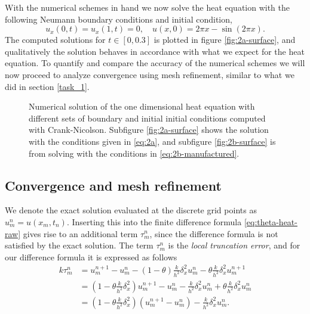 With the numerical schemes in hand we now solve the heat equation with the following Neumann boundary conditions and initial condition, 
\begin{equation}
    u_x(0,t) = u_x(1,t) = 0, \quad u(x,0) = 2\pi x - \sin(2\pi x). 
    \label{eq:2a}
\end{equation}
The computed solutions for $t \in [0, 0.3]$ is plotted in figure \ref{fig:2a-surface}, 
and qualitatively the solution behaves in accordance with what we expect for the heat equation. 
To quantify and compare the accuracy of the numerical schemes we will now proceed to analyze convergence using mesh refinement, 
similar to what we did in section \ref{task_1}. 

%    

\begin{figure}[hb]
    \caption{
        Numerical solution of the one dimensional heat equation with different sets of boundary and initial initial conditions computed with Crank-Nicolson. 
        Subfigure \ref{fig:2a-surface} shows the solution with the conditions given in \eqref{eq:2a}, 
        and subfigure \ref{fig:2b-surface} is from solving with the conditions in \eqref{eq:2b-manufactured}. 
    }
\end{figure}


%    

\subsection{Convergence and mesh refinement}
We denote the exact solution evaluated at the discrete grid points as $u_m^n = u(x_m, t_n)$. 
Inserting this into the finite difference formula \eqref{eq:theta-heat-raw} gives rise to an additional term $\tau_m^n$, 
since the difference formula is not satisfied by the exact solution. 
The term $\tau_m^n$ is the \textit{local truncation error}, 
and for our difference formula it is expressed as follows 
\begin{align*}
    k\tau_m^n & = u_m^{n+1} - u_m^n - (1-\theta)\frac{k}{h^2}\delta_x^2 u_m^n - \theta\frac{k}{h^2}\delta_x^2 u_m^{n+1}\\
    & = (1 - \theta\frac{k}{h^2}\delta_x^2)u_m^{n+1} - u_m^n-\frac{k}{h^2}\delta_x^2 u_m^n + \theta\frac{k}{h^2}\delta_x^2u_m^n\\
    & = (1 - \theta\frac{k}{h^2}\delta_x^2)(u_m^{n+1} - u_m^n) - \frac{k}{h^2}\delta_x^2 u_m^n.
\end{align*}

